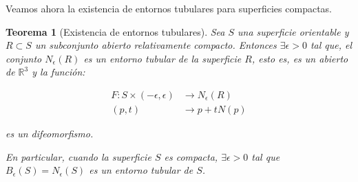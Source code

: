 \documentclass[paper=a4, fontsize=11pt, spanish]{scrartcl}
\newcommand{\rtres}{\mathbb{R}^3}
\newtheorem{theorem}{Teorema}[section]
\theoremstyle{definition}
\theoremstyle{definition}
\theoremstyle{definition}
\begin{document}
Veamos ahora la existencia de entornos tubulares para superficies compactas.
\begin{theorem}[Existencia de entornos tubulares]
Sea $S$ una superficie orientable y $R \subset S$ un subconjunto abierto relativamente compacto. Entonces $\exists \epsilon > 0$ tal que, el conjunto $N_\epsilon(R)$ es un entorno tubular de la superficie $R$, esto es, es un abierto de $\rtres$ y la función:

\begin{align*}
    F: S \times (-\epsilon, \epsilon) &\longrightarrow N_\epsilon(R) \\
    (p,t) &\longrightarrow p + tN(p)
\end{align*}

es un difeomorfismo.

En particular, cuando la superficie $S$ es compacta, $\exists \epsilon > 0$ tal que
$B_\epsilon(S)=N_\epsilon(S)$ es un entorno tubular de $S$.
\end{theorem}
\end{document}

